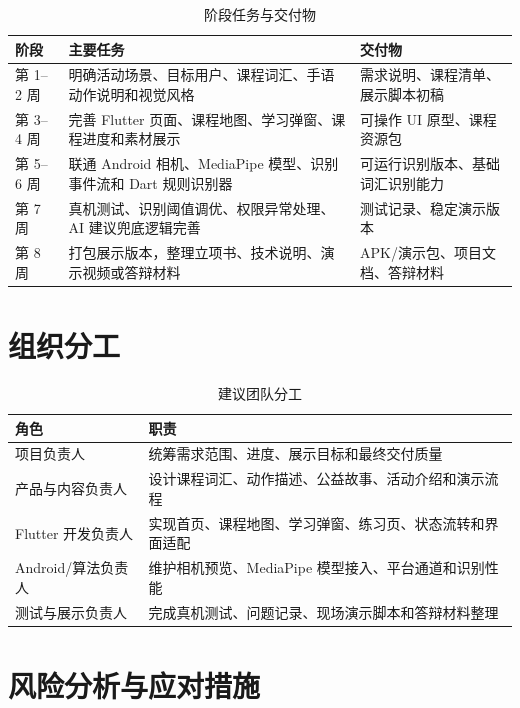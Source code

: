 \documentclass[UTF8,a4paper,12pt]{ctexart}
\begin{document}
\begin{table}[htbp]
\centering
\caption{阶段任务与交付物}
\begin{tabularx}{\textwidth}{p{2.2cm}Y Y}
\toprule
阶段 & 主要任务 & 交付物 \\
\midrule
第 1--2 周 & 明确活动场景、目标用户、课程词汇、手语动作说明和视觉风格 & 需求说明、课程清单、展示脚本初稿 \\
第 3--4 周 & 完善 Flutter 页面、课程地图、学习弹窗、课程进度和素材展示 & 可操作 UI 原型、课程资源包 \\
第 5--6 周 & 联通 Android 相机、MediaPipe 模型、识别事件流和 Dart 规则识别器 & 可运行识别版本、基础词汇识别能力 \\
第 7 周 & 真机测试、识别阈值调优、权限异常处理、AI 建议兜底逻辑完善 & 测试记录、稳定演示版本 \\
第 8 周 & 打包展示版本，整理立项书、技术说明、演示视频或答辩材料 & APK/演示包、项目文档、答辩材料 \\
\bottomrule
\end{tabularx}
\end{table}

\section{组织分工}

\begin{table}[htbp]
\centering
\caption{建议团队分工}
\begin{tabularx}{\textwidth}{p{3cm}Y}
\toprule
角色 & 职责 \\
\midrule
项目负责人 & 统筹需求范围、进度、展示目标和最终交付质量 \\
产品与内容负责人 & 设计课程词汇、动作描述、公益故事、活动介绍和演示流程 \\
Flutter 开发负责人 & 实现首页、课程地图、学习弹窗、练习页、状态流转和界面适配 \\
Android/算法负责人 & 维护相机预览、MediaPipe 模型接入、平台通道和识别性能 \\
测试与展示负责人 & 完成真机测试、问题记录、现场演示脚本和答辩材料整理 \\
\bottomrule
\end{tabularx}
\end{table}

\section{风险分析与应对措施}
\end{document}
